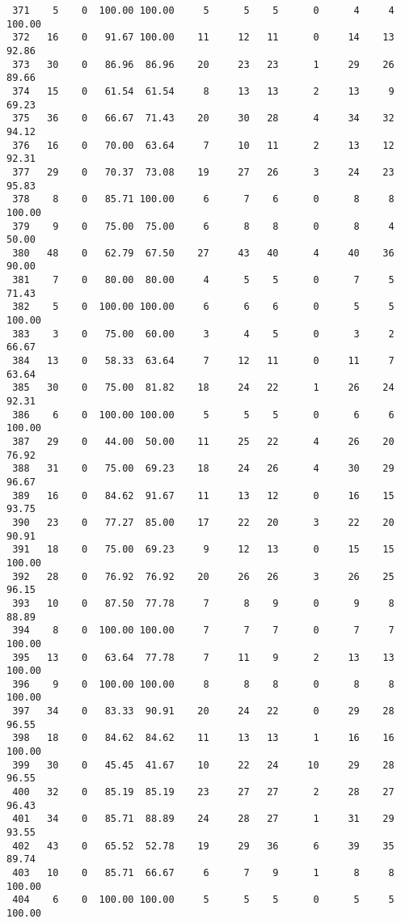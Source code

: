 \begin{verbatim}
 371    5    0  100.00 100.00     5      5    5      0      4     4   100.00
 372   16    0   91.67 100.00    11     12   11      0     14    13    92.86
 373   30    0   86.96  86.96    20     23   23      1     29    26    89.66
 374   15    0   61.54  61.54     8     13   13      2     13     9    69.23
 375   36    0   66.67  71.43    20     30   28      4     34    32    94.12
 376   16    0   70.00  63.64     7     10   11      2     13    12    92.31
 377   29    0   70.37  73.08    19     27   26      3     24    23    95.83
 378    8    0   85.71 100.00     6      7    6      0      8     8   100.00
 379    9    0   75.00  75.00     6      8    8      0      8     4    50.00
 380   48    0   62.79  67.50    27     43   40      4     40    36    90.00
 381    7    0   80.00  80.00     4      5    5      0      7     5    71.43
 382    5    0  100.00 100.00     6      6    6      0      5     5   100.00
 383    3    0   75.00  60.00     3      4    5      0      3     2    66.67
 384   13    0   58.33  63.64     7     12   11      0     11     7    63.64
 385   30    0   75.00  81.82    18     24   22      1     26    24    92.31
 386    6    0  100.00 100.00     5      5    5      0      6     6   100.00
 387   29    0   44.00  50.00    11     25   22      4     26    20    76.92
 388   31    0   75.00  69.23    18     24   26      4     30    29    96.67
 389   16    0   84.62  91.67    11     13   12      0     16    15    93.75
 390   23    0   77.27  85.00    17     22   20      3     22    20    90.91
 391   18    0   75.00  69.23     9     12   13      0     15    15   100.00
 392   28    0   76.92  76.92    20     26   26      3     26    25    96.15
 393   10    0   87.50  77.78     7      8    9      0      9     8    88.89
 394    8    0  100.00 100.00     7      7    7      0      7     7   100.00
 395   13    0   63.64  77.78     7     11    9      2     13    13   100.00
 396    9    0  100.00 100.00     8      8    8      0      8     8   100.00
 397   34    0   83.33  90.91    20     24   22      0     29    28    96.55
 398   18    0   84.62  84.62    11     13   13      1     16    16   100.00
 399   30    0   45.45  41.67    10     22   24     10     29    28    96.55
 400   32    0   85.19  85.19    23     27   27      2     28    27    96.43
 401   34    0   85.71  88.89    24     28   27      1     31    29    93.55
 402   43    0   65.52  52.78    19     29   36      6     39    35    89.74
 403   10    0   85.71  66.67     6      7    9      1      8     8   100.00
 404    6    0  100.00 100.00     5      5    5      0      5     5   100.00

\end{verbatim}
